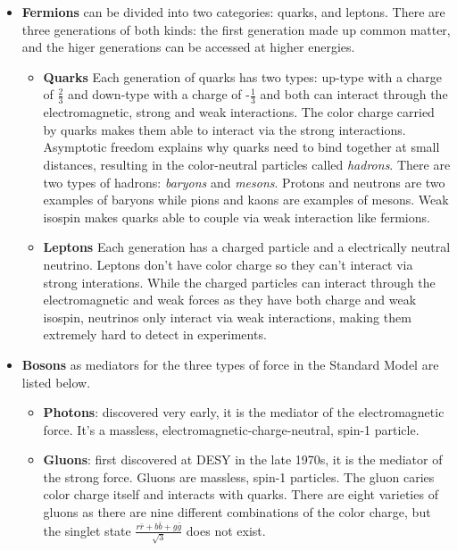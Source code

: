 \begin{itemize}
  \item \textbf{Fermions} can be divided into two categories: quarks, and leptons. There are three generations of both kinds: the first generation made up common matter, and the higer generations can be accessed at higher energies.
\begin{itemize}
  \item \textbf{Quarks} Each generation of quarks has two types: up-type with a charge of $\frac{2}{3}$ and down-type with a charge of -$\frac{1}{3}$ and both
      can interact through the electromagnetic, strong and weak interactions. The color charge carried by quarks makes them able to 
interact via the strong interactions. Asymptotic freedom explains why quarks need to bind together at small distances, resulting in the color-neutral particles called \textit{hadrons}. 
        There are two types of hadrons: \textit{baryons} and \textit{mesons}. Protons and neutrons are two examples of baryons while pions and kaons are examples of mesons. Weak isospin makes quarks able to couple via weak interaction like fermions.
  \item \textbf{Leptons} Each generation has a charged particle and a electrically neutral neutrino. Leptons don't have color charge so they can't interact via strong interations. While the charged particles can interact through the electromagnetic and weak forces as they have both charge and weak isospin, neutrinos only interact via weak interactions, making them extremely hard to detect in experiments.
\end{itemize}
  \item \textbf{Bosons} as mediators for the three types of force in the Standard Model are listed below.
\begin{itemize}
  \item \textbf{Photons}: discovered very early, it is the mediator of the electromagnetic force. It's a massless, electromagnetic-charge-neutral, spin-1 particle.
  \item \textbf{Gluons}: first discovered at DESY in the late 1970s, it is the mediator of the strong force. 
      Gluons are massless, spin-1 particles. The gluon caries color charge itself and interacts with quarks. 
        There are eight varieties of gluons as there are nine different combinations of the color charge, but the singlet state $\frac{r\bar{r}+b\bar{b}+g\bar{g}}{\sqrt{3}}$ does not exist.


\end{itemize}
\end{itemize}
